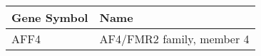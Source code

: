 \begin{tabular}{ll}
\toprule
Gene Symbol &                      Name \\
\midrule
       AFF4 & AF4/FMR2 family, member 4 \\
\bottomrule
\end{tabular}
